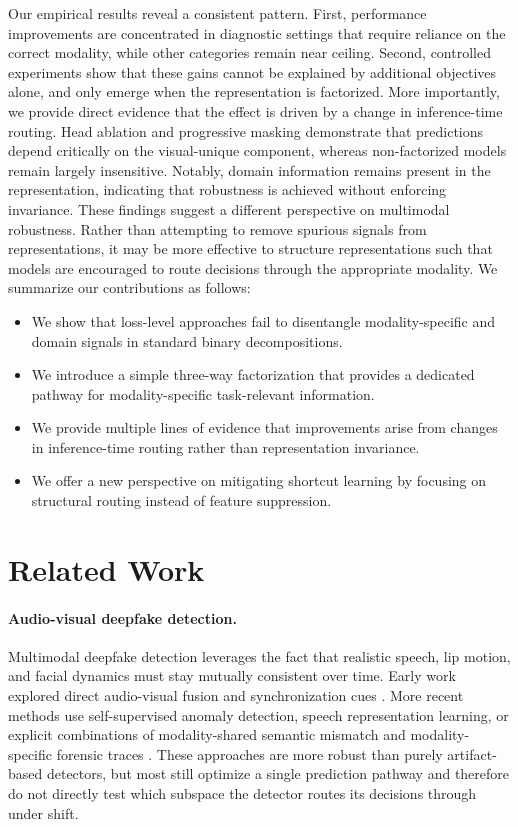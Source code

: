 \documentclass{article}
\begin{document}
Our empirical results reveal a consistent pattern. First, performance improvements are concentrated in diagnostic settings that require reliance on the correct modality, while other categories remain near ceiling. Second, controlled experiments show that these gains cannot be explained by additional objectives alone, and only emerge when the representation is factorized.
More importantly, we provide direct evidence that the effect is driven by a change in inference-time routing. Head ablation and progressive masking demonstrate that predictions depend critically on the visual-unique component, whereas non-factorized models remain largely insensitive. Notably, domain information remains present in the representation, indicating that robustness is achieved without enforcing invariance.
These findings suggest a different perspective on multimodal robustness. Rather than attempting to remove spurious signals from representations, it may be more effective to structure representations such that models are encouraged to route decisions through the appropriate modality.
We summarize our contributions as follows:
\begin{itemize}
\item We show that loss-level approaches fail to disentangle modality-specific and domain signals in standard binary decompositions.
\item We introduce a simple three-way factorization that provides a dedicated pathway for modality-specific task-relevant information.
\item We provide multiple lines of evidence that improvements arise from changes in inference-time routing rather than representation invariance.
\item We offer a new perspective on mitigating shortcut learning by focusing on structural routing instead of feature suppression.
\end{itemize}

\section{Related Work}

\paragraph{Audio-visual deepfake detection.}
Multimodal deepfake detection leverages the fact that realistic speech, lip motion, and facial dynamics must stay mutually consistent over time. Early work explored direct audio-visual fusion and synchronization cues \citep{zhou2021jointav, chung2016syncnet}. More recent methods use self-supervised anomaly detection, speech representation learning, or explicit combinations of modality-shared semantic mismatch and modality-specific forensic traces \citep{feng2023avad, liang2024speechforensics, smeu2025avhalign, du2025cad}. These approaches are more robust than purely artifact-based detectors, but most still optimize a single prediction pathway and therefore do not directly test which subspace the detector routes its decisions through under shift.
\end{document}
